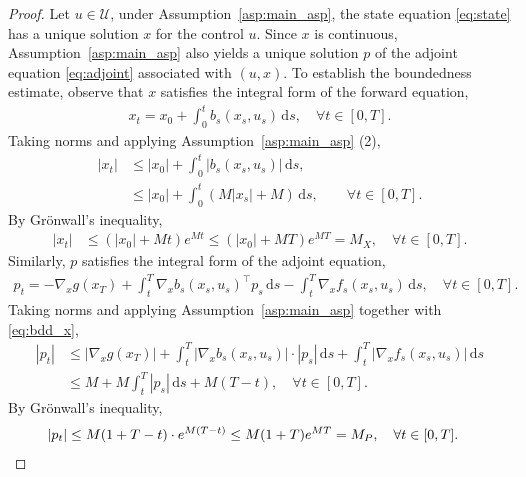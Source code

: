 \documentclass[11pt]{amsart}
\theoremstyle{plain}
\theoremstyle{definition}
\theoremstyle{remark}
\newcommand{\dd}{\,\mathrm{d}}
\begin{document}
\begin{proof}
    Let $u \in \mathcal U$, under Assumption~\ref{asp:main_asp}, the state equation \eqref{eq:state} has a unique solution $x$ for the control $u$. Since $x$ is continuous, Assumption~\ref{asp:main_asp} also yields a unique solution $p$ of the adjoint equation \eqref{eq:adjoint} associated with $(u,x)$. To establish the boundedness estimate, observe that $x$ satisfies the integral form of the forward equation,
    \begin{align}
        x_t = x_0 + \int_{0}^{t} b_s(x_s, u_s )\dd s , \quad \forall t \in [0,T]. \nonumber
    \end{align}
    Taking norms and applying Assumption~\ref{asp:main_asp} (2),
    \begin{align}
        |x_t| & \leq |x_0| + \int_{0}^{t} |b_s(x_s, u_s)| \dd s, \nonumber \\
        & \leq |x_0| + \int_{0}^{t} \left( M|x_s| + M \right) \dd s,
        \qquad \forall t \in [0,T]. \nonumber
    \end{align}
    By Gr\"onwall's inequality,
    \begin{align}\label{eq:bdd_x}
        |x_t| & \leq ( |x_0| + Mt) e^{Mt} \leq ( |x_0| + MT) e^{MT} = M_X, \quad \forall t \in [0,T].
    \end{align}
    Similarly, $p$ satisfies the integral form of the adjoint equation,
    \begin{align}
        p_t = - \nabla_x g(x_T) +  \int^{T}_{t} \nabla_x b_s( x_s, u_s)^\top p_s \dd s - \int_{t}^{T} \nabla_x f_s( x_s, u_s) \dd s, \quad \forall t \in [0,T]. \nonumber
    \end{align}
    Taking norms and applying Assumption~\ref{asp:main_asp} together with \eqref{eq:bdd_x},
    \begin{align}
        |p_t| & \leq |\nabla_x g(x_T)| + \int_{t }^{T} |\nabla_x b_s(x_s, u_s)| \cdot |p_s| \dd s + \int_{t }^{T} |\nabla_x f_s(x_s, u_s)| \dd s \nonumber \\
        & \leq M + M \int_{t }^{T} |p_s| \dd s + M(T-t), \quad \forall t \in [0,T]. \nonumber
    \end{align}
    By Gr\"onwall's inequality,
    \begin{align}
        |p_t| & \leq M (1 + T-t) \cdot e^{M(T-t)} \leq M(1+T)e^{MT} = M_P, \quad \forall t \in [0,T]. \nonumber \qedhere
    \end{align}
\end{proof}

\smallskip 
\end{document}
